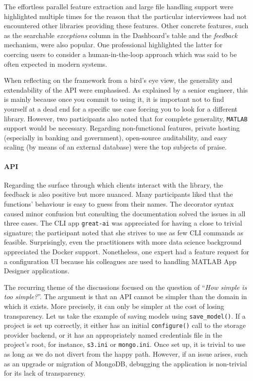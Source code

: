 The effortless parallel feature extraction and large file handling support were highlighted multiple times for the reason that the particular interviewees had not encountered other libraries providing these features. Other concrete features, such as the searchable \textit{exceptions} column in the Dashboard's table and the \textit{feedback} mechanism, were also popular. One professional highlighted the latter for coercing users to consider a human-in-the-loop approach which was said to be often expected in modern systems.

When reflecting on the framework from a bird's eye view, the generality and extendability of the API were emphasised. As explained by a senior engineer, this is mainly because once you commit to using it, it is important not to find yourself at a dead end for a specific use case forcing you to look for a different library. However, two participants also noted that for complete generality, \texttt{MATLAB} support would be necessary. Regarding non-functional features, private hosting (especially in banking and government), open-source auditability, and easy scaling (by means of an external database) were the top subjects of praise.

\paragraph{API} Regarding the surface through which clients interact with the library, the feedback is also positive but more nuanced. Many participants liked that the functions' behaviour is easy to guess from their names. The decorator syntax caused minor confusion but consulting the documentation solved the issues in all three cases. The CLI app \texttt{great-ai} was appreciated for having a close to trivial signature; the participant noted that she strives to use as few CLI commands as feasible. Surprisingly, even the practitioners with more data science background appreciated the Docker support. Nonetheless, one expert had a feature request for a configuration UI because his colleagues are used to handling MATLAB App Designer applications.

The recurring theme of the discussions focused on the question of ``\textit{How simple is too simple?}''. The argument is that an API cannot be simpler than the domain in which it exists. More precisely, it can only be simpler at the cost of losing transparency. Let us take the example of saving models using \texttt{save\_model()}. If a project is set up correctly, it either has an initial \texttt{configure()} call to the storage provider backend, or it has an appropriately named credentials file in the project's root, for instance, \texttt{s3.ini} or \texttt{mongo.ini}. Once set up, it is trivial to use as long as we do not divert from the happy path. However, if an issue arises, such as an upgrade or migration of MongoDB, debugging the application is non-trivial for its lack of transparency.

